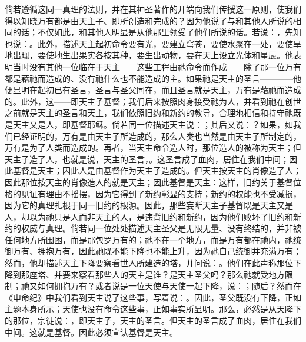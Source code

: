 倘若遵循这同一真理的法则，并在其神圣著作的开端向我们传授这一原则，使我们得以知晓万有都是由天主子、即所创造和完成的？因为他说了与和其他人所说的相同的话；不仅如此，和其他人明显是从他那里领受了他们所说的话。若说：，先知也说：。此外，描述天主起初命令要有光，要建立穹苍，要使水聚在一处，要使旱地出现，要使地生出果实各按其种，要生出动物，要在天上设立光体和星辰。他表明当时没有其他一位临在于天主——这些工程由祂命令而作成——除了那一位万有都是藉祂而造成的、没有祂什么也不能造成的主。如果祂是天主的圣言————他便显明在起初已有圣言，圣言与圣父同在，而且圣言就是天主，万有是藉祂而造成的。此外，这——即天主子基督；我们后来按照肉身接受祂为人，并看到祂在创世之前就是天主的圣言和天主，我们依照旧约和新约的教导，合理地相信和持守祂既是天主又是人，即基督耶稣。倘若同一位描述天主说：；其后又说：？如果，如我们已经证明的，万有是由天主子所造成的，那么人类也当然是由天主子所制定的，万有是为了人类而造成的。再者，当天主命令造人时，那位造人的被称为天主；但天主子造了人，也就是说，天主的圣言，。这圣言成了血肉，居住在我们中间；因此基督是天主；因此人是由基督作为天主子造成的。但天主按天主的肖像造了人；因此那位按天主的肖像造人的就是天主；因此基督是天主：这样，旧约关于基督位格的见证有理由不摇摆，因为它得到了新约彰显的支持；新约的权能也不受减损，因为它的真理扎根于同一旧约的根源。因此，那些妄断天主子基督既是天主又是人，却以为祂只是人而非天主的人，是违背旧约和新约，因为他们败坏了旧约和新约的权威与真理。倘若同一位处处描述天主圣父是无限无量、没有终结的，并非被任何地方所围困，而是那包罗万有的；祂不在一个地方，而是万有都在祂内，祂统御万有、拥抱万有，因此祂既不能下降也不能上升，因为祂自己统御并充满万有；然而，他却描述天主下降要察看世人所建造的塔，并问说：。他们在此声称那位下降到那座塔、并要来察看那些人的天主是谁？是天主圣父吗？那么祂就受地方限制；祂又如何拥抱万有？或者说是一位天使与天使一起下降，说：；随后？然而在《申命纪》中我们看到天主说了这些事，写着说：。因此，圣父既没有下降，正如主题本身所示；天使也没有命令这些事，正如事实所显明。那么，必然是从天降下的那位，宗徒说：，即天主子，天主的圣言。但天主的圣言成了血肉，居住在我们中间。这就是基督。因此必须宣认基督是天主。\par

